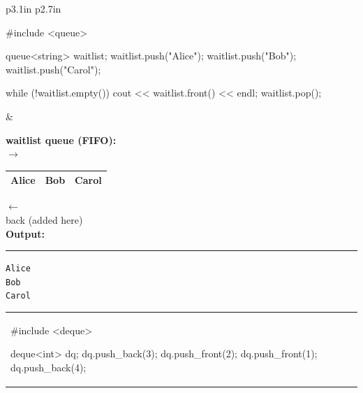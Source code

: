   \begin{center}
    \small
    \begin{tabular}{p{3.1in} p{2.7in}}
      \begin{minipage}{3.1in}
        \begin{cpplst}
#include <queue>

queue<string> waitlist;
waitlist.push("Alice");
waitlist.push("Bob");
waitlist.push("Carol");

while (!waitlist.empty()) {
    cout << waitlist.front() << endl;
    waitlist.pop();
}
        \end{cpplst}
      \end{minipage}
      &
      \begin{minipage}{2.7in}
        \vskip 6pt
        {\bf waitlist queue (FIFO):}\\[4pt]
        $\rightarrow$\begin{tabular}{|c|c|c|}
          \hline
          Alice & Bob & Carol \\
          \hline
        \end{tabular}$\leftarrow$\\
        \hspace*{0.1in}{\small front (served first)} \hfill {\small back (added here)}\hspace*{0.3in}\\[8pt]
        {\bf Output:}
        \hrule\vskip 5pt
        {\tt Alice}\\
        {\tt Bob}\\
        {\tt Carol}
      \end{minipage}
    \end{tabular}
    \vskip 14pt
    \begin{tabular}{p{3.1in} p{2.7in}}
      \begin{minipage}{3.1in}
        \begin{cpplst}
#include <deque>

deque<int> dq;
dq.push_back(3);
dq.push_front(2);
dq.push_front(1);
dq.push_back(4);


\end{cpplst}
\end{minipage}
\end{tabular}
\end{center}

